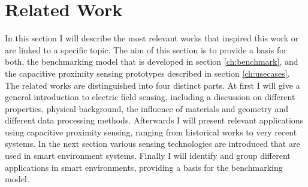 \chapter{Related Work}
\label{ch:related_work}
In this section I will describe the most relevant works that inspired this work  or are linked to a specific topic. The aim of this section is to provide a basis for both, the benchmarking model that is developed in section \ref{ch:benchmark}, and the capacitive proximity sensing prototypes described in section \ref{ch:usecases}. The related works are distinguished into four distinct parts. At first I will give a general introduction to electric field sensing, including a discussion on different properties, physical background, the influence of materials and geometry and different data processing methods. Afterwards I will  present relevant applications using capacitive proximity sensing, ranging from historical works to very recent systems. In the next section various sensing technologies are introduced that are used in smart environment systems. Finally I will identify and group different applications in smart environments, providing a basis for the benchmarking model.

\clearpage 

\clearpage

\clearpage

